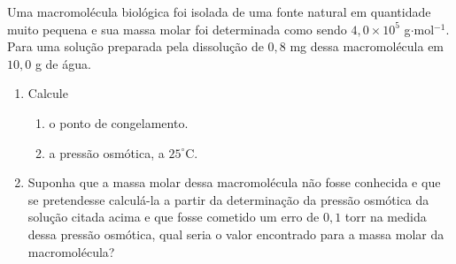 Uma macromolécula biológica foi isolada de uma fonte natural em quantidade muito pequena e sua massa molar foi determinada como sendo $4,0 \times 10^5$ g$\cdot$mol$^{-1}$.
Para uma solução preparada pela dissolução de $0,8$ mg dessa macromolécula em $10,0$ g de água.

\begin{enumerate}[label = (\alph*)]
	\item Calcule
		\begin{enumerate}[label = (a.\roman*)]
			\item o ponto de congelamento.
			\item a pressão osmótica, a $25 ^\circ$C.
		\end{enumerate}
	\item Suponha que a massa molar dessa macromolécula não fosse conhecida e que se pretendesse calculá-la a partir da determinação da pressão osmótica da solução citada acima e que fosse cometido um erro de $0,1$ torr na medida dessa pressão osmótica, qual seria o valor encontrado para a massa molar da macromolécula?
\end{enumerate}
